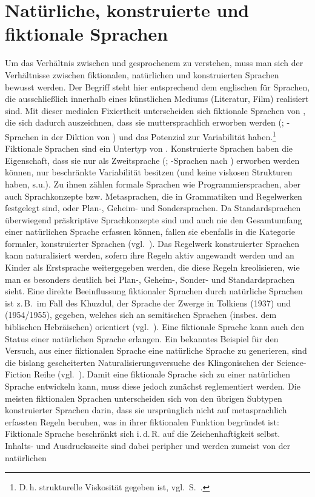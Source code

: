 \section{Natürliche, konstruierte und fiktionale Sprachen}\label{kunstsprachen}
 \largerpage %
Um das Verhältnis zwischen  und gesprochenem  zu verstehen, muss man sich der Verhältnisse zwischen fiktionalen, natürlichen und konstruierten Sprachen bewusst werden. Der Begriff  steht hier entsprechend dem englischen  für Sprachen, die ausschließlich innerhalb eines künstlichen Mediums (Literatur, Film) realisiert sind. Mit dieser medialen Fixiertheit unterscheiden sich fiktionale Sprachen von , die sich dadurch auszeichnen, dass sie muttersprachlich erworben werden (; -Sprachen in der Diktion von  \citealt[90]{Weiss2001}) und das Potenzial zur Variabilität haben.\footnote{D.\,h. strukturelle Viskosität gegeben ist, vgl.\, S.\, \pageref{viskoserstemal}.} Fiktionale Sprachen sind ein Untertyp von . Konstruierte Sprachen haben die Eigenschaft, dass sie nur als Zweitsprache (; -Sprachen nach \citealt[90]{Weiss2001}) erworben werden können, nur beschränkte Variabilität besitzen (und keine viskosen Strukturen haben, s.u.). Zu ihnen zählen formale Sprachen wie Programmiersprachen, aber auch Sprachkonzepte bzw. Metasprachen, die in Grammatiken und Regelwerken festgelegt sind, oder Plan-, Geheim- und Sondersprachen. Da Standardsprachen überwiegend präskriptive Sprachkonzepte sind und auch nie den Gesamtumfang einer natürlichen Sprache erfassen können, fallen sie ebenfalls in die Kategorie formaler, konstruierter Sprachen (vgl.\, \citealt[51]{Chomsky1995}). Das Regelwerk konstruierter Sprachen kann naturalisiert werden, sofern ihre Regeln aktiv angewandt werden und an Kinder als Erstsprache weitergegeben werden, die diese Regeln kreolisieren, wie man es besonders deutlich bei Plan-, Geheim-, Sonder- und Standardsprachen sieht. Eine direkte Beeinflussung fiktionaler Sprachen durch natürliche Sprachen ist z.\,B.\, im Fall des Khuzdul, der Sprache der Zwerge in Tolkiens   (1937) und  (1954/1955), gegeben, welches sich an semitischen Sprachen (insbes. dem biblischen Hebräischen) orientiert (vgl.\, \citealt[120]{ConleyCain2006}). Eine fiktionale Sprache kann auch den Status einer natürlichen Sprache erlangen. Ein bekanntes Beispiel für den Versuch, aus einer fiktionalen Sprache eine natürliche Sprache zu generieren, sind die bislang gescheiterten Naturalisierungsversuche des Klingonischen der Science-Fiction Reihe  (vgl.\, \citealt{Okrent2010}). Damit  eine fiktionale Sprache sich zu einer natürlichen Sprache entwickeln kann, muss diese jedoch zunächst reglementiert werden. Die meisten fiktionalen Sprachen unterscheiden sich von den übrigen Subtypen konstruierter Sprachen darin, dass sie ursprünglich nicht auf metasprachlich erfassten Regeln beruhen, was in ihrer fiktionalen Funktion begründet ist: Fiktionale Sprache beschränkt sich i.\,d.\,R. auf die Zeichenhaftigkeit selbst. Inhalts- und Ausdrucksseite sind dabei peripher und werden zumeist von der natürlichen 